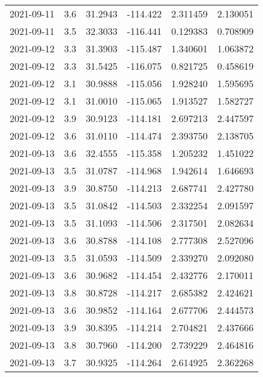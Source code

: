 \begin{tabular}{lrrrrr}
2021-09-11 &       3.6 &  31.2943 &  -114.422 &         2.311459 &         2.130051 \\
2021-09-11 &       3.5 &  32.3033 &  -116.441 &         0.129383 &         0.708909 \\
2021-09-12 &       3.3 &  31.3903 &  -115.487 &         1.340601 &         1.063872 \\
2021-09-12 &       3.3 &  31.5425 &  -116.075 &         0.821725 &         0.458619 \\
2021-09-12 &       3.1 &  30.9888 &  -115.056 &         1.928240 &         1.595695 \\
2021-09-12 &       3.1 &  31.0010 &  -115.065 &         1.913527 &         1.582727 \\
2021-09-12 &       3.9 &  30.9123 &  -114.181 &         2.697213 &         2.447597 \\
2021-09-12 &       3.6 &  31.0110 &  -114.474 &         2.393750 &         2.138705 \\
2021-09-13 &       3.6 &  32.4555 &  -115.358 &         1.205232 &         1.451022 \\
2021-09-13 &       3.5 &  31.0787 &  -114.968 &         1.942614 &         1.646693 \\
2021-09-13 &       3.9 &  30.8750 &  -114.213 &         2.687741 &         2.427780 \\
2021-09-13 &       3.5 &  31.0842 &  -114.503 &         2.332254 &         2.091597 \\
2021-09-13 &       3.5 &  31.1093 &  -114.506 &         2.317501 &         2.082634 \\
2021-09-13 &       3.6 &  30.8788 &  -114.108 &         2.777308 &         2.527096 \\
2021-09-13 &       3.5 &  31.0593 &  -114.509 &         2.339270 &         2.092080 \\
2021-09-13 &       3.6 &  30.9682 &  -114.454 &         2.432776 &         2.170011 \\
2021-09-13 &       3.8 &  30.8728 &  -114.217 &         2.685382 &         2.424621 \\
2021-09-13 &       3.6 &  30.9852 &  -114.164 &         2.677706 &         2.444573 \\
2021-09-13 &       3.9 &  30.8395 &  -114.214 &         2.704821 &         2.437666 \\
2021-09-13 &       3.8 &  30.7960 &  -114.200 &         2.739229 &         2.464816 \\
2021-09-13 &       3.7 &  30.9325 &  -114.264 &         2.614925 &         2.362268 \\

\end{tabular}
